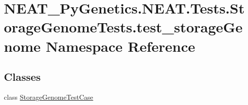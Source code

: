 \hypertarget{namespaceNEAT__PyGenetics_1_1NEAT_1_1Tests_1_1StorageGenomeTests_1_1test__storageGenome}{}\section{N\+E\+A\+T\+\_\+\+Py\+Genetics.\+N\+E\+A\+T.\+Tests.\+Storage\+Genome\+Tests.\+test\+\_\+storage\+Genome Namespace Reference}
\label{namespaceNEAT__PyGenetics_1_1NEAT_1_1Tests_1_1StorageGenomeTests_1_1test__storageGenome}
\subsection*{Classes}
\begin{DoxyCompactItemize}
\item 
class \hyperlink{classNEAT__PyGenetics_1_1NEAT_1_1Tests_1_1StorageGenomeTests_1_1test__storageGenome_1_1StorageGenomeTestCase}{Storage\+Genome\+Test\+Case}
\end{DoxyCompactItemize}
